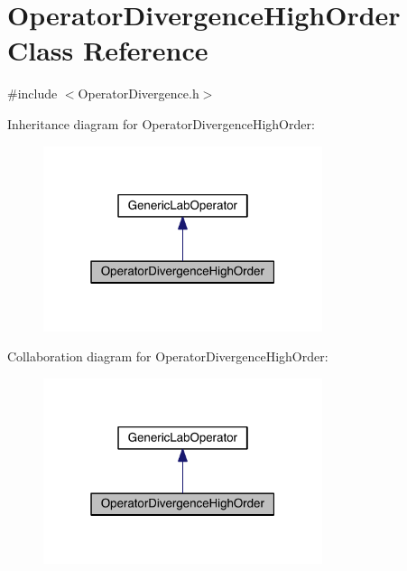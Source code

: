 \hypertarget{class_operator_divergence_high_order}{}\section{Operator\+Divergence\+High\+Order Class Reference}
\label{class_operator_divergence_high_order}


{\ttfamily \#include $<$Operator\+Divergence.\+h$>$}



Inheritance diagram for Operator\+Divergence\+High\+Order\+:\nopagebreak
\begin{figure}[H]
\begin{center}
\leavevmode
\includegraphics[width=232pt]{dd/d0e/class_operator_divergence_high_order__inherit__graph}
\end{center}
\end{figure}


Collaboration diagram for Operator\+Divergence\+High\+Order\+:\nopagebreak
\begin{figure}[H]
\begin{center}
\leavevmode
\includegraphics[width=232pt]{d6/d4b/class_operator_divergence_high_order__coll__graph}
\end{center}
\end{figure}

